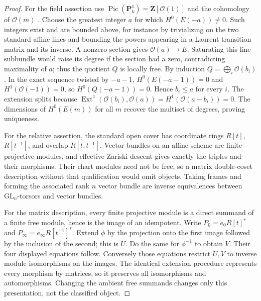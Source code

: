 \begin{proof}
For the field assertion use
$\operatorname{Pic}(\mathbf P^1_k)=\mathbf Z[\mathcal O(1)]$
\cite[Lemma 31.29.5, tag 0BXJ]{geoStacksPicPn} and the cohomology of
$\mathcal O(m)$ \cite[Lemma 30.8.1, tag 01XS]{geoStacksProjectiveCoh}.
Choose the greatest integer $a$ for which
$H^0(E(-a))\ne0$. Such integers exist and are bounded above, for instance
by trivializing on the two standard affine lines and bounding the powers
appearing in a Laurent transition matrix and its inverse. A nonzero
section gives $\mathcal O(a)\to E$. Saturating this line subbundle would
raise its degree if the section had a zero, contradicting maximality of
$a$; thus the quotient $Q$ is locally free. By induction
$Q=\bigoplus_i\mathcal O(b_i)$. In the exact sequence twisted by $-a-1$,
$H^0(E(-a-1))=0$ and $H^1(\mathcal O(-1))=0$, so
$H^0(Q(-a-1))=0$. Hence $b_i\leq a$ for every $i$.
The extension splits because
$\operatorname{Ext}^1(\mathcal O(b_i),\mathcal O(a))
=H^1(\mathcal O(a-b_i))=0$. The dimensions of $H^0(E(m))$ for all $m$
recover the multiset of degrees, proving uniqueness.

For the relative assertion, the standard open cover has coordinate rings
$R[t]$, $R[t^{-1}]$, and overlap $R[t,t^{-1}]$. Vector bundles on an affine
scheme are finite projective modules, and effective Zariski descent gives
exactly the triples and their morphisms. Their chart modules need not be
free, so a matrix double-coset description without that qualification would
omit objects. Taking frames and forming the associated rank $n$ vector
bundle are inverse equivalences between $\mathrm{GL}_n$-torsors and
vector bundles.

For the matrix description, every finite projective module is a direct
summand of a finite free module, hence is the image of an idempotent.
Write $P_0=e_0R[t]^r$ and $P_\infty=e_\infty R[t^{-1}]^s$.
Extend $\phi$ by the projection onto the first image followed by the
inclusion of the second; this is $U$. Do the same for $\phi^{-1}$ to
obtain $V$. Their four displayed equations follow. Conversely those
equations restrict $U,V$ to inverse module isomorphisms on the images.
The identical extension procedure represents every morphism by matrices,
so it preserves all isomorphisms and automorphisms. Changing the ambient
free summands changes only this presentation, not the classified object.
\end{proof}

